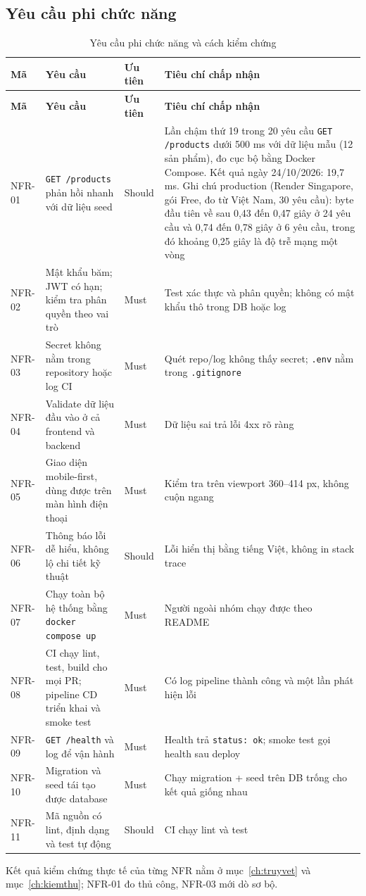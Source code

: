 \documentclass[a4paper]{article}
\begin{document}
\subsection{Yêu cầu phi chức năng}\label{sec:se-nfr}
{\small
\begin{longtable}{@{}p{1.18cm}p{4.80cm}p{1.09cm}p{5.98cm}@{}}
\caption{Yêu cầu phi chức năng và cách kiểm chứng}\label{tab:nfr}\\
\toprule \textbf{Mã} & \textbf{Yêu cầu} & \textbf{Ưu tiên} & \textbf{Tiêu chí chấp nhận} \\ \midrule \endfirsthead
\toprule \textbf{Mã} & \textbf{Yêu cầu} & \textbf{Ưu tiên} & \textbf{Tiêu chí chấp nhận} \\ \midrule \endhead
\bottomrule \endlastfoot
NFR-01 & \texttt{GET /\allowbreak{}products} phản hồi nhanh với dữ liệu seed & Should & Lần chậm thứ 19 trong 20 yêu cầu \texttt{GET /\allowbreak{}products} dưới 500 ms với dữ liệu mẫu (12 sản phẩm), đo cục bộ bằng Docker Compose. Kết quả ngày 24/10/2026: 19,7 ms. Ghi chú production (Render Singapore, gói Free, đo từ Việt Nam, 30 yêu cầu): byte đầu tiên về sau 0,43 đến 0,47 giây ở 24 yêu cầu và 0,74 đến 0,78 giây ở 6 yêu cầu, trong đó khoảng 0,25 giây là độ trễ mạng một vòng \\
NFR-02 & Mật khẩu băm; JWT có hạn; kiểm tra phân quyền theo vai trò & Must & Test xác thực và phân quyền; không có mật khẩu thô trong DB hoặc log \\
NFR-03 & Secret không nằm trong repository hoặc log CI & Must & Quét repo/log không thấy secret; \texttt{.env} nằm trong \texttt{.gitignore} \\
NFR-04 & Validate dữ liệu đầu vào ở cả frontend và backend & Must & Dữ liệu sai trả lỗi 4xx rõ ràng \\
NFR-05 & Giao diện mobile-first, dùng được trên màn hình điện thoại & Must & Kiểm tra trên viewport 360–414 px, không cuộn ngang \\
NFR-06 & Thông báo lỗi dễ hiểu, không lộ chi tiết kỹ thuật & Should & Lỗi hiển thị bằng tiếng Việt, không in stack trace \\
NFR-07 & Chạy toàn bộ hệ thống bằng \texttt{docker compose up} & Must & Người ngoài nhóm chạy được theo README \\
NFR-08 & CI chạy lint, test, build cho mọi PR; pipeline CD triển khai và smoke test & Must & Có log pipeline thành công và một lần phát hiện lỗi \\
NFR-09 & \texttt{GET /\allowbreak{}health} và log để vận hành & Must & Health trả \texttt{status: ok}; smoke test gọi health sau deploy \\
NFR-10 & Migration và seed tái tạo được database & Must & Chạy migration + seed trên DB trống cho kết quả giống nhau \\
NFR-11 & Mã nguồn có lint, định dạng và test tự động & Should & CI chạy lint và test \\
\end{longtable}}
Kết quả kiểm chứng thực tế của từng NFR nằm ở mục~\ref{ch:truyvet} và mục~\ref{ch:kiemthu}; NFR-01 đo thủ công, NFR-03 mới dò sơ bộ.
\end{document}
